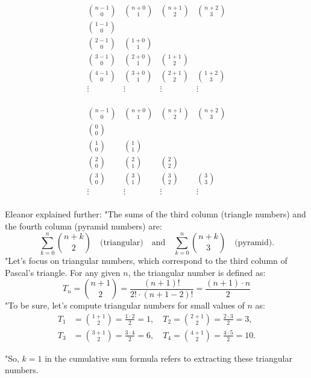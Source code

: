 \begin{minipage}{0.5\textwidth}
\[
\begin{array}{cccc}
\binom{n-1}{0} & \binom{n+0}{1} & \binom{n+1}{2} & \binom{n+2}{3}\\
\hline
\binom{1-1}{0} & & & \\
\binom{2-1}{0} & \binom{1+0}{1} & & \\
\binom{3-1}{0} & \binom{2+0}{1} & \binom{1+1}{2} & \\
\binom{4-1}{0} & \binom{3+0}{1} & \binom{2+1}{2} & \binom{1+2}{3} \\
\vdots & \vdots & \vdots & \vdots \\
\end{array}
\]
\end{minipage}%
\begin{minipage}{0.5\textwidth}
\[
\begin{array}{cccc}
\binom{n-1}{0} & \binom{n+0}{1} & \binom{n+1}{2} & \binom{n+2}{3}\\
\hline
\binom{0}{0} & & & \\
\binom{1}{0} & \binom{1}{1} & & \\
\binom{2}{0} & \binom{2}{1} & \binom{2}{2} & \\
\binom{3}{0} & \binom{3}{1} & \binom{3}{2} & \binom{3}{3} \\
\vdots & \vdots & \vdots & \vdots \\
\end{array}
\]
\end{minipage}
Eleanor explained further: "The sums of the third column (triangle numbers) and the fourth column (pyramid numbers) are:
\[
\sum_{k=0}^{n} \binom{n+k}{2} \quad \text{(triangular)}
\quad
\text{and} \quad
\sum_{k=0}^{n} \binom{n+k}{3} \quad \text{(pyramid)}.
\]
"Let’s focus on triangular numbers, which correspond to the third column of Pascal’s triangle. For any given \(n\), the triangular number is defined as:
\[
T_n = \binom{n+1}{2} = \frac{(n+1)!}{2! \cdot (n+1-2)!}= \frac{(n+1) \cdot n}{2}
\]
\noindent
"To be sure, let’s compute triangular numbers for small values of \(n\) as:
\[
\begin{aligned}
T_1 &= \binom{1+1}{2} = \frac{1 \cdot 2}{2} = 1, \quad
T_2 = \binom{2+1}{2} = \frac{2 \cdot 3}{2} = 3, \\
T_3 &= \binom{3+1}{2} = \frac{3 \cdot 4}{2} = 6, \quad
T_4 = \binom{4+1}{2} = \frac{4 \cdot 5}{2} = 10.
\end{aligned}
\]

"So, \(k=1\) in the cumulative sum formula refers to extracting these triangular numbers.

